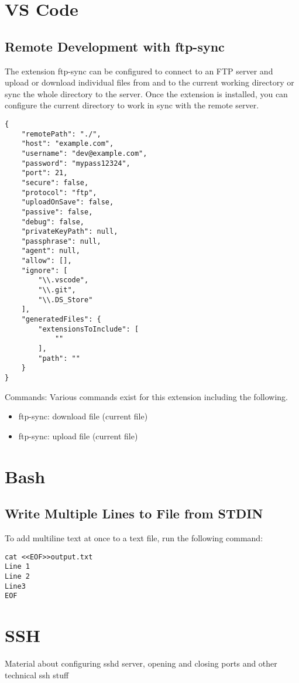 \documentclass{article}
\begin{document}
\section{VS Code}
\subsection{Remote Development with ftp-sync}
The extension ftp-sync can be configured to connect to an FTP server and upload or download individual files from and to the current working directory or sync the whole directory to the server. 
Once the extension is installed, you can configure the current directory to work in sync with the remote server.
\begin{verbatim}
{
    "remotePath": "./",
    "host": "example.com",
    "username": "dev@example.com",
    "password": "mypass12324",
    "port": 21,
    "secure": false,
    "protocol": "ftp",
    "uploadOnSave": false,
    "passive": false,
    "debug": false,
    "privateKeyPath": null,
    "passphrase": null,
    "agent": null,
    "allow": [],
    "ignore": [
        "\\.vscode",
        "\\.git",
        "\\.DS_Store"
    ],
    "generatedFiles": {
        "extensionsToInclude": [
            ""
        ],
        "path": ""
    }
}
\end{verbatim}

Commands:
Various commands exist for this extension including the following.
\begin{itemize}
 \item ftp-sync: download file (current file)
 \item ftp-sync: upload file (current file)
\end{itemize}


\section{Bash}
\subsection{Write Multiple Lines to File from STDIN}
To add multiline text at once to a text file, run the following command:

\begin{lstlisting}
cat <<EOF>>output.txt
Line 1
Line 2
Line3
EOF
\end{lstlisting}

\section{SSH}
Material about configuring sshd server, opening and closing ports and other technical ssh stuff
\end{document}
